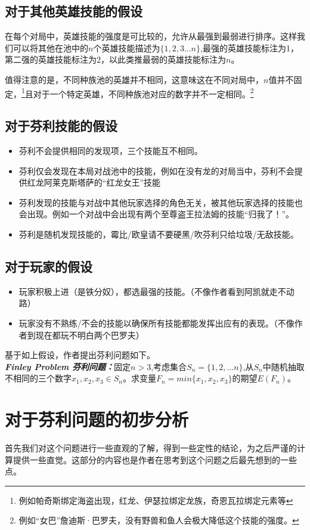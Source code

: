 \documentclass{ctexart}
\theoremstyle{definition}
\begin{document}
\subsection{对于其他英雄技能的假设}
在每个对局中，英雄技能的强度是可比较的，允许从最强到最弱进行排序。这样我们可以将其他在池中的$n$个英雄技能描述为$\{1,2,3...n\}$,最强的英雄技能标注为1，第二强的英雄技能标注为2，以此类推最弱的英雄技能标注为$n$。

值得注意的是，不同种族池的英雄并不相同，这意味这在不同对局中，$n$值并不固定，\footnote{例如帕奇斯绑定海盗出现，红龙、伊瑟拉绑定龙族，奇恩瓦拉绑定元素等}且对于一个特定英雄，不同种族池对应的数字并不一定相同。\footnote{例如“女巴”詹迪斯·巴罗夫，没有野兽和鱼人会极大降低这个技能的强度。}

\subsection{对于芬利技能的假设}
\begin{itemize}
    \item 芬利不会提供相同的发现项，三个技能互不相同。
    \item 芬利仅会发现在本局对战池中的技能，例如在没有龙的对局当中，芬利不会提供红龙阿莱克斯塔萨的“红龙女王”技能
    \item 芬利发现的技能与对战中其他玩家选择的角色无关，被其他玩家选择的技能也会出现。例如一个对战中会出现有两个至尊盗王拉法姆的技能“归我了！”。
    \item 芬利是随机发现技能的，霉比/欧皇请不要硬黑/吹芬利只给垃圾/无敌技能。
\end{itemize}

\subsection{对于玩家的假设}
\begin{itemize}
    \item 玩家积极上进（是铁分奴），都选最强的技能。（不像作者看到阿凯就走不动路）
    \item 玩家没有不熟练/不会的技能以确保所有技能都能发挥出应有的表现。（不像作者到现在都玩不明白两个巴罗夫）
\end{itemize}
基于如上假设，作者提出芬利问题如下。\\
{\bfseries \emph{Finley Problem 芬利问题：}}固定$n > 3 $,考虑集合$S_n=\{1,2,...n\}$,从$S_n$中随机抽取不相同的三个数字$x_1,x_2,x_3 \in S_n$。求变量$F_n=min\{x_1,x_2,x_3\}$的期望$E(F_n)$。
\section{对于芬利问题的初步分析}
首先我们对这个问题进行一些直观的了解，得到一些定性的结论，为之后严谨的计算提供一些直觉。这部分的内容也是作者在思考到这个问题之后最先想到的一些点。
\end{document}
